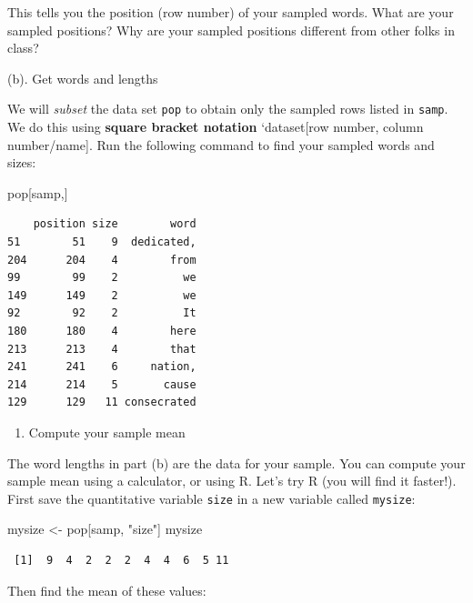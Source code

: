 \documentclass[
]{book}
\newenvironment{Shaded}{\begin{snugshade}}{\end{snugshade}}
\newcommand{\NormalTok}[1]{#1}
\newcommand{\OtherTok}[1]{\textcolor[rgb]{0.56,0.35,0.01}{#1}}
\newcommand{\StringTok}[1]{\textcolor[rgb]{0.31,0.60,0.02}{#1}}
\providecommand{\tightlist}{%
  \setlength{\itemsep}{0pt}\setlength{\parskip}{0pt}}
\begin{document}
This tells you the position (row number) of your sampled words. What are your sampled positions? Why are your sampled positions different from other folks in class?

(b). Get words and lengths

We will \emph{subset} the data set \texttt{pop} to obtain only the sampled rows listed in \texttt{samp}. We do this using \textbf{square bracket notation} `dataset{[}row number, column number/name{]}. Run the following command to find your sampled words and sizes:

\begin{Shaded}
\begin{Highlighting}[]
\NormalTok{pop[samp,]}
\end{Highlighting}
\end{Shaded}

\begin{verbatim}
    position size        word
51        51    9  dedicated,
204      204    4        from
99        99    2          we
149      149    2          we
92        92    2          It
180      180    4        here
213      213    4        that
241      241    6     nation,
214      214    5       cause
129      129   11 consecrated
\end{verbatim}

\begin{enumerate}
\def\labelenumi{\alph{enumi}.}
\setcounter{enumi}{2}
\tightlist
\item
  Compute your sample mean
\end{enumerate}

The word lengths in part (b) are the data for your sample. You can compute your sample mean using a calculator, or using R. Let's try R (you will find it faster!). First save the quantitative variable \texttt{size} in a new variable called \texttt{mysize}:

\begin{Shaded}
\begin{Highlighting}[]
\NormalTok{mysize }\OtherTok{\textless{}{-}}\NormalTok{ pop[samp, }\StringTok{"size"}\NormalTok{]}
\NormalTok{mysize}
\end{Highlighting}
\end{Shaded}

\begin{verbatim}
 [1]  9  4  2  2  2  4  4  6  5 11
\end{verbatim}

Then find the mean of these values:
\end{document}
